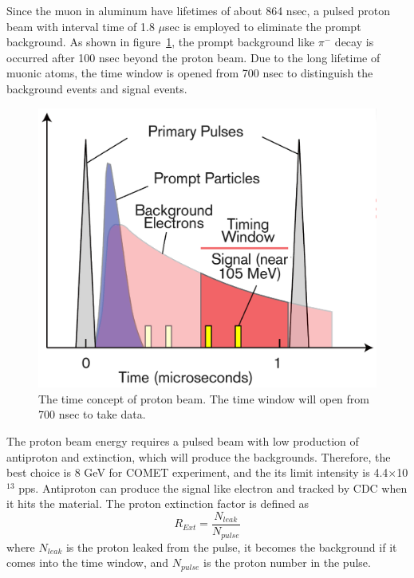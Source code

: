 Since the muon in aluminum have lifetimes of about 864 nsec, a pulsed proton beam with interval time of 1.8 $\mu$sec is employed to eliminate the prompt background.
As shown in figure~\ref{time}, the prompt background like $\pi^-$ decay is occurred after 100 nsec beyond the proton beam.
Due to the long lifetime of muonic atoms, the time window is opened from 700 nsec to distinguish the background events and signal events.
\begin{figure}[H]
 \centering
 \includegraphics[scale=0.4]{chapter1/fig/time.pdf}
 \caption{The time concept of proton beam. The time window will open from 700 nsec to take data.}
 \label{time}
\end{figure}
The proton beam energy requires a pulsed beam with low production of antiproton and extinction, which will produce the backgrounds.
Therefore, the best choice is 8 GeV for COMET experiment, and the its limit intensity is 4.4$\times$10$^{13}$ pps.
Antiproton can produce the signal like electron and tracked by CDC when it hits the material.
The proton extinction factor is defined as
\begin{equation}
 R_{Ext} = \frac{N_{leak}}{N_{pulse}}
\end{equation}
where $N_{leak}$ is the proton leaked from the pulse, it becomes the background if it comes into the time window, and $N_{pulse}$ is the proton number in the pulse.

